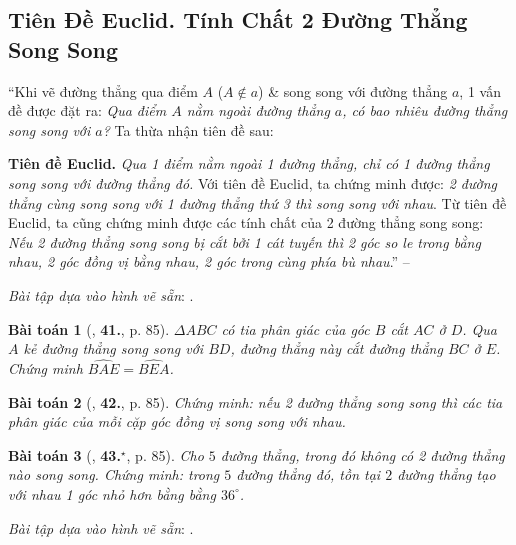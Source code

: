\documentclass{article}
\numberwithin{equation}{section}
\newtheorem{baitoan}{Bài toán}[section]
\begin{document}

\subsection{Tiên Đề Euclid. Tính Chất 2 Đường Thẳng Song Song}
``Khi vẽ đường thẳng qua điểm $A$ ($A\notin a$) \& song song với đường thẳng $a$, 1 vấn đề được đặt ra: \textit{Qua điểm $A$ nằm ngoài đường thẳng $a$, có bao nhiêu đường thẳng song song với $a$?} Ta thừa nhận tiên đề sau:

\textbf{Tiên đề Euclid.} \textit{Qua 1 điểm nằm ngoài 1 đường thẳng, chỉ có 1 đường thẳng song song với đường thẳng đó.} Với tiên đề Euclid, ta chứng minh được: \textit{2 đường thẳng cùng song song với 1 đường thẳng thứ 3 thì song song với nhau}. Từ tiên đề Euclid, ta cũng chứng minh được các tính chất của 2 đường thẳng song song: \textit{Nếu 2 đường thẳng song song bị cắt bởi 1 cát tuyến thì 2 góc so le trong bằng nhau, 2 góc đồng vị bằng nhau, 2 góc trong cùng phía bù nhau}.'' -- \cite[\S7, p. 84]{Binh_Toan_7_tap_1}

\textit{Bài tập dựa vào hình vẽ sẵn}: \cite[Ví dụ 16, p. 84, \textbf{40.}, p. 85]{Binh_Toan_7_tap_1}.

\begin{baitoan}[\cite{Binh_Toan_7_tap_1}, \textbf{41.}, p. 85]
	$\Delta ABC$ có tia phân giác của góc $B$ cắt $AC$ ở $D$. Qua $A$ kẻ đường thẳng song song với $BD$, đường thẳng này cắt đường thẳng $BC$ ở $E$. Chứng minh $\widehat{BAE} = \widehat{BEA}$.
\end{baitoan}

\begin{baitoan}[\cite{Binh_Toan_7_tap_1}, \textbf{42.}, p. 85]
	Chứng minh: nếu 2 đường thẳng song song thì các tia phân giác của mỗi cặp góc đồng vị song song với nhau.
\end{baitoan}

\begin{baitoan}[\cite{Binh_Toan_7_tap_1}, \textbf{43.}${}^\star$, p. 85]
	Cho $5$ đường thẳng, trong đó không có 2 đường thẳng nào song song. Chứng minh: trong $5$ đường thẳng đó, tồn tại $2$ đường thẳng tạo với nhau 1 góc nhỏ hơn bằng bằng $36^\circ$.
\end{baitoan}
\textit{Bài tập dựa vào hình vẽ sẵn}: \cite[\textbf{45.}, p. 87]{Binh_Toan_7_tap_1}.

\end{document}
